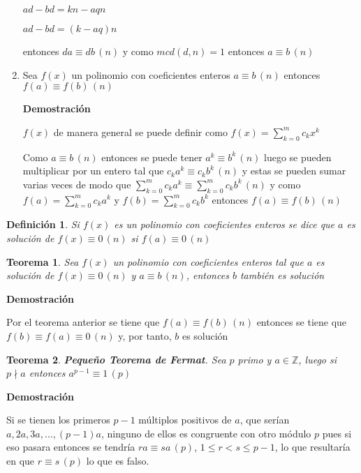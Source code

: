 \documentclass[a4paper,12pt]{report}
\newtheorem*{teo}{Teorema}
\newtheorem*{dfn}{Definición}
\begin{document}
\begin{enumerate}
 $ad-bd=kn-aqn$
 
 $ad-bd=(k-aq)n$
 
 entonces $da\equiv db \, (n)$ y como $mcd(d,n)=1$ entonces $a\equiv b\, (n)$
 
 \item Sea $f(x)$ un polinomio con coeficientes enteros $a \equiv b \, (n)$ entonces 
 $f(a) \equiv f(b) \, (n)$
 
  \textbf{Demostración}
  
  $f(x)$ de manera general se puede definir como $f(x)=\sum^{m}_{k=0}c_kx^k$
  
  Como $a \equiv b \, (n)$ entonces se puede tener $a^k \equiv b^k \, (n)$ luego se pueden multiplicar por un entero tal que $c_ka^k \equiv c_kb^k \, (n)$ y estas se pueden sumar varias veces de modo que $\sum^{m}_{k=0}c_ka^k \equiv \sum^{m}_{k=0}c_kb^k \, (n)$ y como $f(a)=\sum^{m}_{k=0}c_ka^k$ y $f(b)=\sum^{m}_{k=0}c_kb^k$ entonces $f(a)\equiv f(b) \, (n)$
  
  
\end{enumerate}

\begin{dfn}
 Si $f(x)$ es un polinomio con coeficientes enteros se dice que $a$ es solución de $f(x)\equiv 0 \, (n)$ si $f(a)\equiv 0 \, (n)$
\end{dfn}


\begin{teo}
 Sea $f(x)$ un polinomio con coeficientes enteros tal que $a$ es solución de  $f(x)\equiv 0 \, (n)$  y $a \equiv b \, (n)$, entonces $b$ también es solución
\end{teo}

\textbf{Demostración}

Por el teorema anterior se tiene que $f(a)\equiv f(b) \, (n)$ entonces se tiene que $f(b)\equiv f(a) \equiv 0\, (n)$ y, por tanto, $b$ es solución




\begin{teo}
 \textbf{Pequeño Teorema de Fermat}. Sea $p$ primo y $a\in\mathbb{Z}$, luego si $p\nmid a$ entonces $a^{p-1} \equiv 1 \, (p)$
\end{teo}

\textbf{Demostración}

Si se tienen los primeros $p-1$ múltiplos positivos de $a$, que serían $a,2a,3a,\dots,(p-1)a$, ninguno de ellos es congruente con otro módulo $p$ pues si eso pasara entonces se tendría $ra\equiv sa \, (p)$, $1\leq r < s \leq p-1$, lo que resultaría en que $r\equiv s \, (p)$ lo que es falso.
\end{document}

